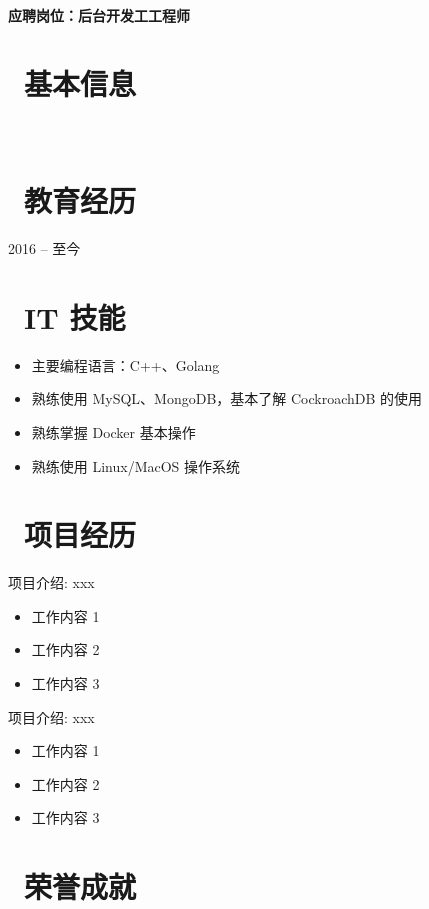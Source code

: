 \documentclass{resume}
\begin{document}

  \hfill \vspace{2mm} \\
\textbf{应聘岗位：后台开发⼯工程师}

\section{\faInfo\ 基本信息} \vspace{1mm}
{\phone {} \qquad\qquad\quad
\email {} \vspace{2mm} \\
\github {} \qquad
\faLink {}}

\section{\faGraduationCap\ 教育经历} \vspace{1mm}
 {2016 -- 至今}

\section{\faCogs\ IT 技能} \vspace{1mm}
\begin{itemize}[parsep=1ex]
  \item 主要编程语言：C++、Golang
  \item 熟练使⽤ MySQL、MongoDB，基本了解 CockroachDB 的使用
  \item 熟练掌握 Docker 基本操作
  \item 熟练使⽤ Linux/MacOS 操作系统
\end{itemize} \vspace{1mm}

\section{\faUsers\ 项目经历}
项目介绍: xxx
\begin{itemize}[parsep=1ex]
  \item 工作内容 1
  \item 工作内容 2
  \item 工作内容 3
\end{itemize} \vspace{1mm}

项目介绍: xxx
\begin{itemize}[parsep=1ex]
  \item 工作内容 1
  \item 工作内容 2
  \item 工作内容 3
\end{itemize}

\section{\faTrophy\ 荣誉成就}
\end{document}
